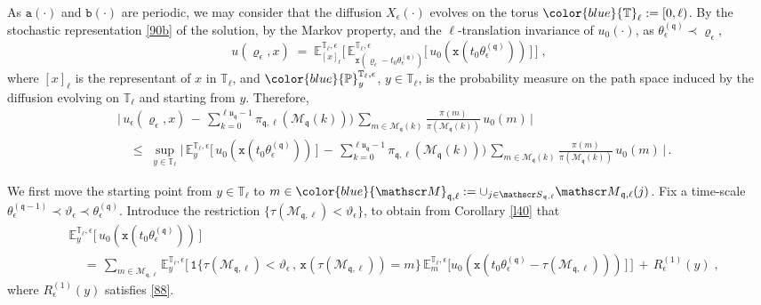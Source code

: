 \documentclass[reqno]{amsart}
\theoremstyle{plain}
\theoremstyle{definition}
\newcommand{\mf}[1]{{\mathfrak #1}}
\newcommand{\bb}[1]{{\mathbb #1}}
\newcommand{\ms}[1]{{\mathscr #1}}
\newcommand{\mtt}[1]{{\mathtt #1}}
\newcounter{as}[section]
\newcommand{\<}{\langle}
\renewcommand{\>}{\rangle}
\begin{document}
As $\mtt a(\cdot)$ and $\mtt b(\cdot)$ are periodic, we may consider
that the diffusion $X_\epsilon(\cdot)$ evolves on the torus
${\color{blue} \bb T_\ell} := [0,\ell)$.  By the stochastic
representation \eqref{90b} of the solution, by the Markov property,
and the $\ell$-translation invariance of $u_0(\cdot)$, as
$\theta^{(\mf q)}_\epsilon \prec \varrho_\epsilon$,
\begin{equation*}
u(\varrho_\epsilon,x) \;=\;
\bb E^{\bb T_\ell, \epsilon}_{[x]_\ell} \Big[ \,
\bb E^{\bb T_\ell,\epsilon}_{\mtt x(\varrho_\epsilon - t_0 \theta^{(\mf q)}_\epsilon)}
\big[ \,
u_0( \mtt x(t_0\theta^{(\mf q)}_\epsilon))\,\big]\, \Big] \;,
\end{equation*}
where $[x]_\ell$ is the representant of $x$ in $\bb T_\ell$, and
$\color{blue} \bb P^{\bb T_\ell, \epsilon}_{y}$, $y\in \bb T_\ell$, is
the probability measure on the path space induced by the diffusion
evolving on $\bb T_\ell$ and starting from $y$. Therefore,
\begin{equation*}
\begin{aligned}
& \Big|\, u_{\epsilon}(\varrho_{\epsilon} , x)
\,-\, \sum_{k=0}^{\ell \mf u_{\mf q}- 1}
\pi_{\mf q, \ell} (\ms M_{\mf q}(k)))\,
\sum_{m \in \ms M_{\mf q} (k)}
\frac{\pi(m)}{\pi(\ms M_{\mf q}(k))} \, u_{0}(m) \, \Big|
\\
& \quad \le\;
\sup_{y\in \bb T_\ell}
\Big|\, \bb E^{\bb T_\ell,\epsilon}_{y}
\big[ \,
u_0( \mtt x(t_0 \theta^{(\mf q)}_\epsilon))\,\big]
\,-\, \sum_{k=0}^{\ell \mf u_{\mf q}- 1}
\pi_{\mf q, \ell} (\ms M_{\mf q}(k)))\,
\sum_{m \in \ms M_{\mf q} (k)}
\frac{\pi(m)}{\pi(\ms M_{\mf q}(k))} \, u_{0}(m) \, \Big|\,.
\end{aligned}
\end{equation*}

We first move the starting point from $y\in \bb T_\ell$ to
$m\in {\color{blue} \ms M_{\mf q, \ell}} := \cup_{j\in \ms S_{\mf q,
\ell}} \ms M_{\mf q, \ell} (j)$. Fix a time-scale
$\theta^{(\mf q-1)}_\epsilon \prec \vartheta_\epsilon\prec
\theta^{(\mf q)}_\epsilon$.  Introduce the restriction
$\{\tau(\ms M_{\mf q, \ell}) < \vartheta_\epsilon\}$, to obtain from
Corollary \ref{l40} that
\begin{align}
\label{91c}
& \bb E^{\bb T_\ell,\epsilon}_{y} \big[ \,
u_0( \mtt x(t_0 \theta^{(\mf q)}_\epsilon))\,\big]
\\
&\quad \,=\,
\sum_{m\in \ms M_{\mf q, \ell}} \bb E^{\bb T_\ell, \epsilon}_{y}
\Big[ \, \mtt 1\big\{ \tau(\ms M_{\mf q, \ell}) <
\vartheta_\epsilon \,,\, \mtt x(\tau(\ms M_{\mf q, \ell})) = m \}\, 
\bb E^{\bb T_\ell,\epsilon}_{m} \big[ u_0( \mtt x(t_0 \theta^{(\mf q)}_\epsilon
- \tau(\ms M_{\mf q, \ell}) )) \,\big] \,\Big]
\,+\, R^{(1)}_\epsilon (y)\;,
\nonumber
\end{align}
where $R^{(1)}_\epsilon (y)$ satisfies \eqref{88}.
\end{document}
